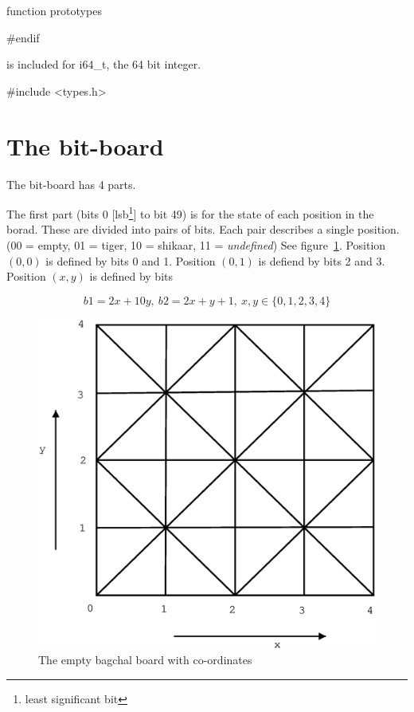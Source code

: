 \documentclass{article}\usepackage{noweb}\pagestyle{noweb}%
\begin{document}
\LA{}function prototypes\RA{}

#endif

\nwendcode{} is included for {\Tt{}i64{\_}t\nwendquote}, the 64 bit integer.

\nwenddocs{}\endmoddef\nwstartdeflinemarkup\nwenddeflinemarkup

#include <types.h>

\nwendcode{}\nwdocspar
\section{The bit-board}

The bit-board has 4 parts.


The first part (bits 0 [lsb\footnote{least significant bit}] to bit 49)
is for the state of each position in the borad. These are divided into
pairs of bits. Each pair describes a single position. (00 = empty,
01 = tiger, 10 = shikaar, 11 = {\em undefined}) See figure~\ref{fig:bagchal-board}.
Position $(0, 0)$ is defined by bits 0 and 1. Position $(0, 1)$ is 
defiend by bits 2 and 3. Position $(x, y)$ is defined by bits

\[
b1 = 2x + 10y,\ b2 = 2x + y + 1,\ x, y \in \{0, 1, 2, 3, 4\}
\]

\begin{figure}

\includegraphics[scale=0.4]{Board.eps}
\caption{The empty bagchal board with co-ordinates}
\label{fig:bagchal-board}

\end{figure}
\end{document}
